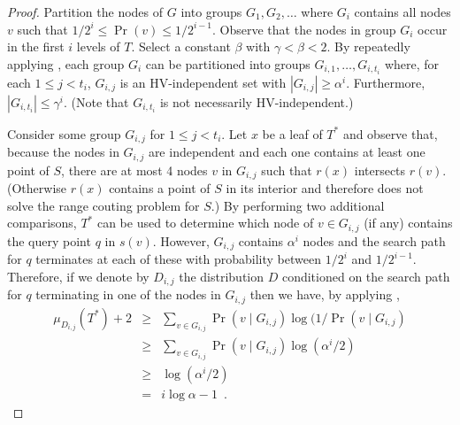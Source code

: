 \documentclass[lotsofwhite,charterfonts]{patmorin}
\begin{document}
\begin{proof}

Partition the nodes of $G$ into groups $G_1,G_2,\ldots$ where $G_i$
contains all nodes $v$ such that $1/2^{i} \le \Pr(v) \le 1/2^{i-1}$.
Observe that the nodes in group $G_i$ occur in the first $i$ levels of
$T$.  Select a constant $\beta$ with $\gamma < \beta < 2$.  By
repeatedly applying , each group $G_i$ can be
partitioned into groups $G_{i,1},\ldots,G_{i,t_i}$ where, for each $1
\le j < t_i$, $G_{i,j}$ is an HV-independent set with $|G_{i,j}|
\ge \alpha^i$.  Furthermore, $|G_{i,t_i}| \le \gamma^i$. (Note that
$G_{i,t_i}$ is not necessarily HV-independent.)

Consider some group $G_{i,j}$ for $1\le j < t_i$.  Let $x$ be a leaf
of $T^*$ and observe that, because the nodes in $G_{i,j}$ are
independent and each one contains at least one point of $S$, there are
at most 4 nodes $v$ in $G_{i,j}$ such that $r(x)$ intersects $r(v)$.
(Otherwise $r(x)$ contains a point of $S$ in its interior and
therefore does not solve the range couting problem for $S$.)
By performing two additional comparisons, $T^*$ can be used to
determine which node of $v\in G_{i,j}$ (if any) contains the query point
$q$ in $s(v)$.  
However, $G_{i,j}$ contains $\alpha^i$ nodes and the search path
for $q$ terminates at each of these with probability between $1/2^i$
and $1/2^{i-1}$.
Therefore, if we denote by $D_{i,j}$ the distribution $D$ conditioned
on the search path for $q$ terminating in one of the nodes in
$G_{i,j}$ then we have, by applying ,
\begin{eqnarray*}
   \mu_{D_{i,j}}(T^*) + 2 
    & \ge & \sum_{v\in G_{i,j}}\Pr(v\mid G_{i,j})\log(1/\Pr(v\mid G_{i,j}) \\
    & \ge & \sum_{v\in G_{i,j}}\Pr(v\mid G_{i,j})\log(\alpha^i/2) \\
    & \ge & \log(\alpha^i/2) \\
    & = & i\log\alpha - 1 \enspace .
\end{eqnarray*}


\end{proof}
\end{document}
